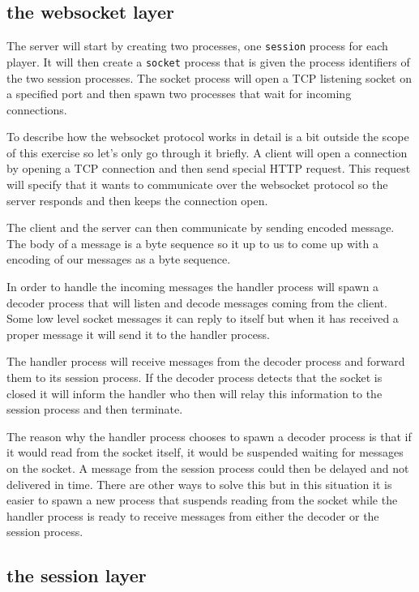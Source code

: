 \documentclass[a4paper,11pt]{article}
\begin{document}
\subsection*{the websocket layer}

The server will start by creating two processes, one {\tt session}
process for each player. It will then create a {\tt socket} process
that is given the process identifiers of the two session
processes. The socket process will open a TCP listening socket on a
specified port and then spawn two processes that wait for incoming
connections.

To describe how the websocket protocol works in detail is a bit outside
the scope of this exercise so let's only go through it briefly. A
client will open a connection by opening a TCP connection and then
send special HTTP request. This request will specify that it wants to
communicate over the websocket protocol so the server responds and
then keeps the connection open.

The client and the server can then communicate by sending encoded
message. The body of a message is a byte sequence so it up to us to
come up with a encoding of our messages as a byte sequence.

In order to handle the incoming messages the handler process will
spawn a decoder process that will listen and decode messages coming
from the client. Some low level socket messages it can reply to itself
but when it has received a proper message it will send it to the
handler process.

The handler process will receive messages from the decoder process and
forward them to its session process. If the decoder process detects
that the socket is closed it will inform the handler who then will
relay this information to the session process and then terminate.

The reason why the handler process chooses to spawn a decoder process
is that if it would read from the socket itself, it would be suspended
waiting for messages on the socket. A message from the session process
could then be delayed and not delivered in time. There are other ways
to solve this but in this situation it is easier to spawn a new
process that suspends reading from the socket while the handler
process is ready to receive messages from either the decoder or the
session process.

\subsection*{the session layer}
\end{document}
